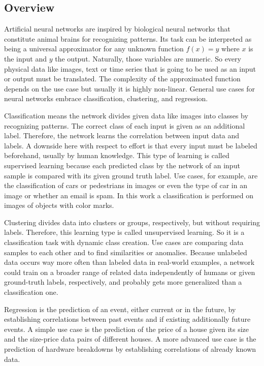 \subsection{Overview}
\label{sec:neural-networks-overview}
Artificial neural networks are inspired by biological neural networks that constitute animal brains for recognizing patterns.
Its task can be interpreted as being a universal approximator for any unknown function $f(x) = y$ where $x$ is the input and $y$ the output.
Naturally, those variables are numeric.
So every physical data like images, text or time series that is going to be used as an input or output must be translated.
The complexity of the approximated function depends on the use case but usually it is highly non-linear.
General use cases for neural networks embrace classification, clustering, and regression.

Classification means the network divides given data like images into classes by recognizing patterns.
The correct class of each input is given as an additional label.
Therefore, the network learns the correlation between input data and labels.
A downside here with respect to effort is that every input must be labeled beforehand, usually by human knowledge.
This type of learning is called supervised learning because each predicted class by the network of an input sample is compared with its given ground truth label.
Use cases, for example, are the classification of cars or pedestrians in images or even the type of car in an image or whether an email is spam.
In this work a classification is performed on images of objects with color marks.

Clustering divides data into clusters or groups, respectively, but without requiring labels.
Therefore, this learning type is called unsupervised learning.
So it is a classification task with dynamic class creation.
Use cases are comparing data samples to each other and to find similarities or anomalies.
Because unlabeled data occurs way more often than labeled data in real-world examples, a network could train on a broader range of related data independently of humans or given ground-truth labels, respectively, and probably gets more generalized than a classification one.

Regression is the prediction of an event, either current or in the future, by establishing correlations between past events and if existing additionally future events.
A simple use case is the prediction of the price of a house given its size and the size-price data pairs of different houses.
A more advanced use case is the prediction of hardware breakdowns by establishing correlations of already known data.